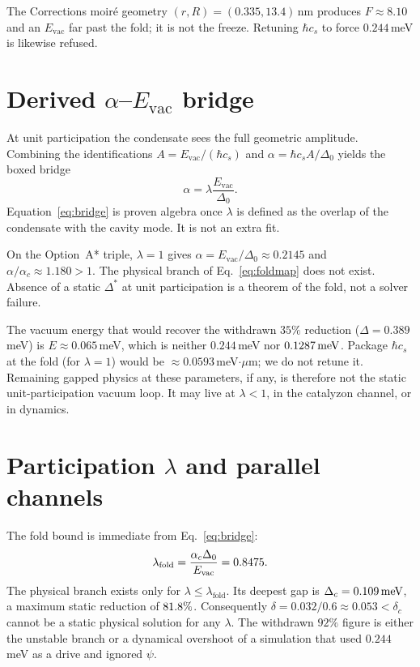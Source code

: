 \documentclass[11pt,letterpaper]{article}
\begin{document}
The Corrections moir\'e geometry $(r,R)=(0.335,13.4)$\,nm produces $F\approx 8.10$ and an $E_{\mathrm{vac}}$ far past the fold; it is not the freeze. Retuning $\hbar c_s$ to force $0.244$\,meV is likewise refused.

\section{Derived \texorpdfstring{$\alpha$--$E_{\mathrm{vac}}$}{alpha--E\_vac} bridge}
\label{sec:bridge}

At unit participation the condensate sees the full geometric amplitude. Combining the identifications $A=E_{\mathrm{vac}}/(\hbar c_s)$ and $\alpha=\hbar c_s A/\Delta_0$ yields the boxed bridge
\begin{equation}
\alpha=\lambda\frac{E_{\mathrm{vac}}}{\Delta_0}.
\label{eq:bridge}
\end{equation}
Equation~\eqref{eq:bridge} is proven algebra once $\lambda$ is defined as the overlap of the condensate with the cavity mode. It is not an extra fit.

\begin{theorem}
\label{thm:foldout}
On the Option~A* triple, $\lambda=1$ gives $\alpha=E_{\mathrm{vac}}/\Delta_0\approx 0.2145$ and $\alpha/\alpha_c\approx 1.180>1$. The physical branch of Eq.~\eqref{eq:foldmap} does not exist. Absence of a static $\Delta^*$ at unit participation is a theorem of the fold, not a solver failure.
\end{theorem}

The vacuum energy that would recover the withdrawn $35\%$ reduction ($\Delta=0.389$\,meV) is $E\approx 0.065$\,meV, which is neither $0.244$\,meV nor $0.1287\,\mathrm{meV}$. Package $\hbar c_s$ at the fold (for $\lambda=1$) would be $\approx 0.0593$\,meV$\cdot\mu$m; we do not retune it. Remaining gapped physics at these parameters, if any, is therefore not the static unit-participation vacuum loop. It may live at $\lambda<1$, in the catalyzon channel, or in dynamics.

\section{Participation \texorpdfstring{$\lambda$}{lambda} and parallel channels}
\label{sec:lambda}

The fold bound is immediate from Eq.~\eqref{eq:bridge}:
\begin{equation}
\lambda_{\mathrm{fold}}=\frac{\alpha_c\Delta_0}{E_{\mathrm{vac}}}=0.8475.
\end{equation}
The physical branch exists only for $\lambda\le\lambda_{\mathrm{fold}}$. Its deepest gap is $\Delta_c=0.109\,\mathrm{meV}$, a maximum static reduction of $81.8\%$. Consequently $\delta=0.032/0.6\approx 0.053<\delta_c$ cannot be a static physical solution for any $\lambda$. The withdrawn $92\%$ figure is either the unstable branch or a dynamical overshoot of a simulation that used $0.244$\,meV as a drive and ignored $\psi$.
\end{document}
